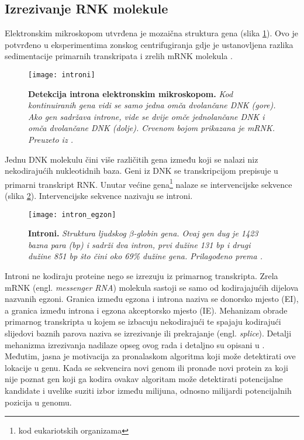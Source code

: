 \subsection{Izrezivanje RNK molekule}
Elektronskim mikroskopom utvrđena je mozaična struktura gena (slika \ref{fig:intron}). Ovo je potvrđeno u eksperimentima zonskog centrifugiranja gdje je ustanovljena razlika sedimentacije primarnih transkripata i zrelih mRNK molekula \cite{Berg01}.
\begin{center}
   \begin{figure}[ht!]
      \begin{center}
         \texttt{[image: introni]}
                 \caption[Detekcija introna elektronskim mikroskopom]{\textbf{Detekcija introna elektronskim mikroskopom.} \textit{Kod kontinuiranih gena vidi se samo jedna omča dvolančane DNK (gore). Ako gen sadržava introne, vide se dvije omče jednolančane DNK i omča dvolančane DNK (dolje). Crvenom bojom prikazana je mRNK. Preuzeto iz \cite{Berg01}.}}
         \label{fig:intron}
      \end{center}
   \end{figure}
\end{center}
Jednu DNK molekulu čini više različitih gena između koji se nalazi niz nekodirajućih nukleotidnih baza. Geni iz DNK se transkripcijom prepisuje u primarni transkript RNK. Unutar većine gena\footnote{kod eukariotskih organizama} nalaze se intervencijske sekvence (slika \ref{fig:gene}). Intervencijske sekvence nazivaju se introni. 
\begin{center}
   \begin{figure}[ht!]
         \texttt{[image: intron\_egzon]}
                 \caption[Introni]{\textbf{Introni.} \textit{Struktura ljudskog $\beta$-globin gena. Ovaj gen dug je 1423 bazna para (bp) i sadrži dva intron, prvi dužine 131 bp i drugi dužine 851 bp što čini oko 69\% dužine gena. Prilagođeno prema \cite{Brown01}.}}
         \label{fig:gene}
   \end{figure}
\end{center}
Introni ne kodiraju proteine nego se izrezuju iz primarnog transkripta. Zrela mRNK (engl. \textit{messenger RNA}) molekula sastoji se samo od kodirajajućih dijelova nazvanih egzoni.
Granica između egzona i introna naziva se donorsko mjesto (EI), a granica između introna i egzona akceptorsko mjesto (IE). Mehanizam obrade primarnog transkripta u kojem se izbacuju nekodirajući te spajaju kodirajući slijedovi baznih parova naziva se izrezivanje ili prekrajanje (engl. \textit{splice}). Detalji mehanizma izrezivanja nadilaze opseg ovog rada i detaljno su opisani u \cite{Brown01, Cox01}. Međutim, jasna je motivacija za pronalaskom algoritma koji može detektirati ove lokacije u genu. Kada se sekvencira novi genom ili pronađe novi protein za koji nije poznat gen koji ga kodira ovakav algoritam može detektirati potencijalne kandidate i uvelike suziti izbor između milijuna, odnosno milijardi potencijalnih pozicija u genomu.
